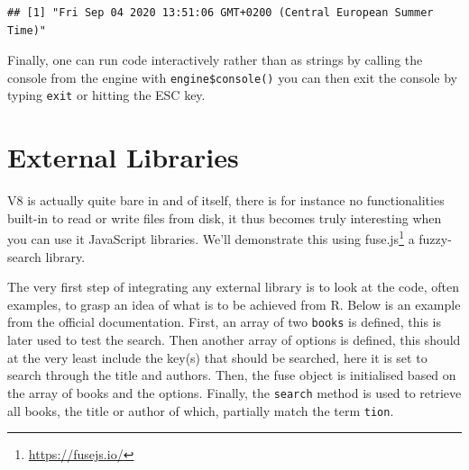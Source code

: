 \documentclass[
]{krantz}
\renewcommand{\href}[2]{#2\footnote{\url{#1}}}
\begin{document}
\begin{verbatim}
## [1] "Fri Sep 04 2020 13:51:06 GMT+0200 (Central European Summer Time)"
\end{verbatim}

Finally, one can run code interactively rather than as strings by calling the console from the engine with \texttt{engine\$console()} you can then exit the console by typing \texttt{exit} or hitting the ESC key.

\hypertarget{v8-external}{%
\section{External Libraries}\label{v8-external}}

V8 is actually quite bare in and of itself, there is for instance no functionalities built-in to read or write files from disk, it thus becomes truly interesting when you can use it JavaScript libraries. We'll demonstrate this using \href{https://fusejs.io/}{fuse.js} a fuzzy-search library.

The very first step of integrating any external library is to look at the code, often examples, to grasp an idea of what is to be achieved from R. Below is an example from the official documentation. First, an array of two \texttt{books} is defined, this is later used to test the search. Then another array of options is defined, this should at the very least include the key(s) that should be searched, here it is set to search through the title and authors. Then, the fuse object is initialised based on the array of books and the options. Finally, the \texttt{search} method is used to retrieve all books, the title or author of which, partially match the term \texttt{tion}.
\end{document}
